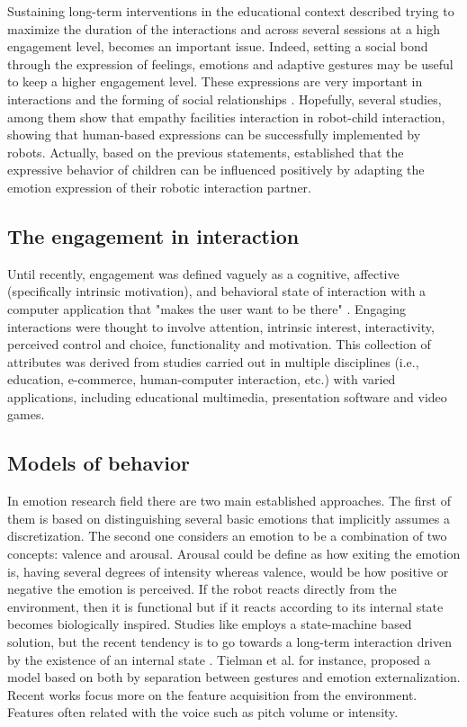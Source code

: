 \documentclass[a4paper, 10pt, conference]{ieeeconf}      %
\begin{document}
Sustaining long-term interventions in the educational context described trying to maximize the duration of the interactions and across several sessions at a high engagement level, becomes an important issue. Indeed, setting a social bond through the expression of feelings, emotions and adaptive gestures may be useful to keep a higher engagement level. These expressions are very important in interactions and the forming of social relationships \cite{butler2003social}\cite{mcneill1992hand}. Hopefully, several studies, among them \cite{leite2012modelling} show that empathy facilities interaction in robot-child interaction, showing that human-based expressions can be successfully implemented by robots. Actually, based on the previous statements, \cite{beran2011understanding} established that the expressive behavior of children can be influenced positively by adapting the emotion expression of their robotic interaction partner.

\subsection{The engagement in interaction}
Until recently, engagement was defined vaguely as a cognitive, affective (specifically intrinsic motivation), and behavioral state of interaction with a computer application that "makes the user want to be there" \cite{ASI:ASI21229}. Engaging interactions were thought to involve attention, intrinsic interest, interactivity, perceived control and choice, functionality and motivation. This collection of attributes was derived from studies carried out in multiple disciplines (i.e., education, e-commerce, human-computer interaction, etc.) with varied applications, including educational multimedia, presentation software and video games.

\subsection{Models of behavior}

In emotion research field there are two main established approaches. The first of them is based on distinguishing several basic emotions that implicitly assumes a discretization. The second one considers an emotion to be a combination of two concepts: valence and arousal. Arousal could be define as how exiting the emotion is, having several degrees of intensity whereas valence, would be how positive or negative the emotion is perceived.
If the robot reacts directly from the environment, then it is functional but if it reacts according to its internal state becomes biologically inspired. Studies like \cite{schulte1999spontaneous} employs a state-machine based solution, but the recent tendency is to go towards a long-term interaction driven by the existence of an internal state \cite{hirth2011towards} \cite{canamero2001show}.
Tielman et al. for instance, proposed a model \cite{tielman2014adaptive} based on both by separation between gestures and emotion externalization. Recent works \cite{lim2014mei} focus more on the feature acquisition from the environment. Features often related with the voice such as pitch volume or intensity.
\end{document}
